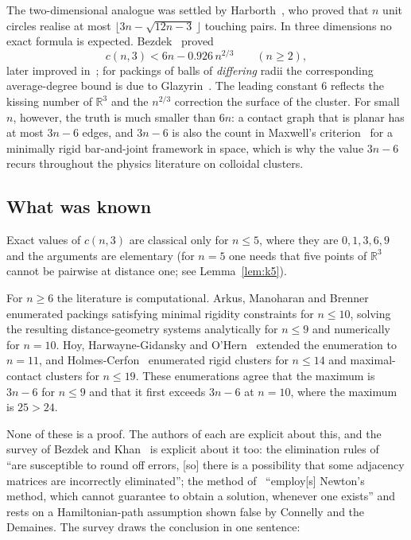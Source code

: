 \documentclass[11pt,a4paper]{article}
\theoremstyle{plain}
\theoremstyle{definition}
\newcommand{\R}{\mathbb{R}}
\begin{document}
The two-dimensional analogue was settled by Harborth~\cite{Harborth1974}, who proved
that $n$ unit circles realise at most $\lfloor 3n - \sqrt{12n-3}\,\rfloor$ touching
pairs. In three dimensions no exact formula is expected. Bezdek~\cite{Bezdek2012}
proved
\[
  c(n,3) < 6n - 0.926\, n^{2/3} \qquad (n \ge 2),
\]
later improved in~\cite{BezdekReid2013}; for packings of balls of \emph{differing}
radii the corresponding average-degree bound is due to Glazyrin~\cite{Glazyrin2020}. The
leading constant $6$ reflects the kissing
number of $\R^3$ and the $n^{2/3}$ correction the surface of the cluster. For small
$n$, however, the truth is much smaller than $6n$: a contact graph that is planar has
at most $3n-6$ edges, and $3n-6$ is also the count in Maxwell's
criterion~\cite{Maxwell1864} for a minimally rigid bar-and-joint framework in space,
which is why the value $3n-6$ recurs throughout the physics literature on colloidal
clusters.

\subsection*{What was known}

Exact values of $c(n,3)$ are classical only for $n \le 5$, where they are $0,1,3,6,9$
and the arguments are elementary (for $n=5$ one needs that five points of $\R^3$ cannot
be pairwise at distance one; see Lemma~\ref{lem:k5}).

For $n \ge 6$ the literature is computational. Arkus, Manoharan and
Brenner~\cite{ArkusPRL2009,ArkusSIAM2011} enumerated packings satisfying minimal
rigidity constraints for $n \le 10$, solving the resulting distance-geometry systems
analytically for $n \le 9$ and numerically for $n = 10$. Hoy, Harwayne-Gidansky and
O'Hern~\cite{Hoy2012} extended the enumeration to $n = 11$, and
Holmes-Cerfon~\cite{HolmesCerfon2016} enumerated rigid clusters for $n \le 14$ and
maximal-contact clusters for $n \le 19$. These enumerations agree that the maximum is
$3n-6$ for $n \le 9$ and that it first exceeds $3n-6$ at $n = 10$, where the maximum is
$25 > 24$.

None of these is a proof. The authors of each are explicit about this, and the survey
of Bezdek and Khan~\cite{BezdekKhan2018} is explicit about it too: the elimination
rules of~\cite{ArkusSIAM2011} ``are susceptible to round off errors, [so] there is a
possibility that some adjacency matrices are incorrectly eliminated''; the method
of~\cite{Hoy2012} ``employ[s] Newton's method, which cannot guarantee to obtain a
solution, whenever one exists'' and rests on a Hamiltonian-path assumption shown false
by Connelly and the Demaines. The survey draws the conclusion in one sentence:
\end{document}
